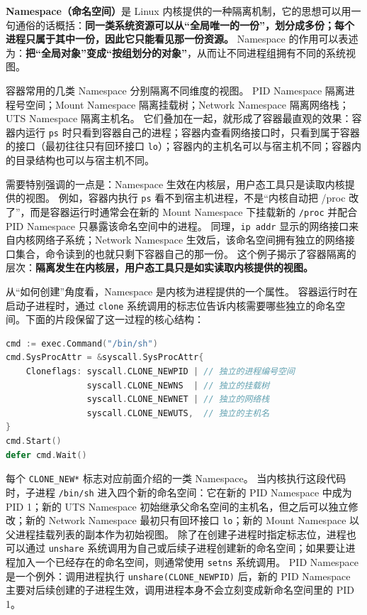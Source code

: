 \textbf{Namespace（命名空间）}是 Linux 内核提供的一种隔离机制，它的思想可以用一句通俗的话概括：\textbf{同一类系统资源可以从“全局唯一的一份”，划分成多份；每个进程只属于其中一份，因此它只能看见那一份资源。}
Namespace 的作用可以表述为：\textbf{把“全局对象”变成“按组划分的对象”}，从而让不同进程组拥有不同的系统视图。

容器常用的几类 Namespace 分别隔离不同维度的视图。
PID Namespace 隔离进程号空间；Mount Namespace 隔离挂载树；Network Namespace 隔离网络栈；UTS Namespace 隔离主机名。
它们叠加在一起，就形成了容器最直观的效果：容器内运行 \texttt{ps} 时只看到容器自己的进程；容器内查看网络接口时，只看到属于容器的接口（最初往往只有回环接口 \texttt{lo}）；容器内的主机名可以与宿主机不同；容器内的目录结构也可以与宿主机不同。

需要特别强调的一点是：Namespace 生效在内核层，用户态工具只是读取内核提供的视图。
例如，容器内执行 \texttt{ps} 看不到宿主机进程，不是“内核自动把 /proc 改了”，而是容器运行时通常会在新的 Mount Namespace 下挂载新的 \texttt{/proc} 并配合 PID Namespace 只暴露该命名空间中的进程。
同理，\texttt{ip addr} 显示的网络接口来自内核网络子系统；Network Namespace 生效后，该命名空间拥有独立的网络接口集合，命令读到的也就只剩下容器自己的那一份。
这个例子揭示了容器隔离的层次：\textbf{隔离发生在内核层，用户态工具只是如实读取内核提供的视图。}

从“如何创建”角度看，Namespace 是内核为进程提供的一个属性。
容器运行时在启动子进程时，通过 \texttt{clone} 系统调用的标志位告诉内核需要哪些独立的命名空间。下面的片段保留了这一过程的核心结构：

\begin{tcolorbox}[title=用 clone 标志位为子进程创建独立命名空间（伪代码）]
\begin{lstlisting}[style=codeblock, language=go]
cmd := exec.Command("/bin/sh")
cmd.SysProcAttr = &syscall.SysProcAttr{
    Cloneflags: syscall.CLONE_NEWPID | // 独立的进程编号空间
                syscall.CLONE_NEWNS  | // 独立的挂载树
                syscall.CLONE_NEWNET | // 独立的网络栈
                syscall.CLONE_NEWUTS,  // 独立的主机名
}
cmd.Start()
defer cmd.Wait()
\end{lstlisting}
\end{tcolorbox}

每个 \texttt{CLONE\_NEW*} 标志对应前面介绍的一类 Namespace。
当内核执行这段代码时，子进程 \texttt{/bin/sh} 进入四个新的命名空间：它在新的 PID Namespace 中成为 PID 1；新的 UTS Namespace 初始继承父命名空间的主机名，但之后可以独立修改；新的 Network Namespace 最初只有回环接口 \texttt{lo}；新的 Mount Namespace 以父进程挂载列表的副本作为初始视图。
除了在创建子进程时指定标志位，进程也可以通过 \texttt{unshare} 系统调用为自己或后续子进程创建新的命名空间；如果要让进程加入一个已经存在的命名空间，则通常使用 \texttt{setns} 系统调用。
PID Namespace 是一个例外：调用进程执行 \texttt{unshare(CLONE\_NEWPID)} 后，新的 PID Namespace 主要对后续创建的子进程生效，调用进程本身不会立刻变成新命名空间里的 PID 1。

